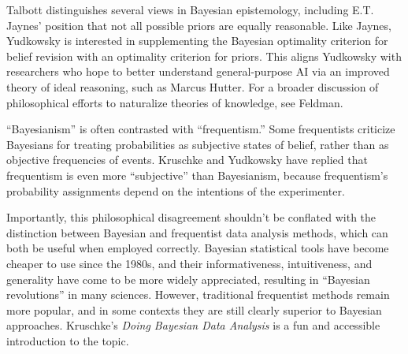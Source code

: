 {
 Talbott distinguishes several views in Bayesian epistemology,
including E.T. Jaynes' position that not all possible
priors are equally reasonable. Like Jaynes,
Yudkowsky is interested in supplementing the Bayesian optimality
criterion for belief revision with an optimality criterion for priors.
This aligns Yudkowsky with researchers who hope to better understand
general-purpose AI via an improved theory of ideal reasoning, such as
Marcus Hutter. For a broader discussion of
philosophical efforts to naturalize theories of knowledge, see
Feldman.}

{
 ``Bayesianism'' is often
contrasted with ``frequentism.''
Some frequentists criticize Bayesians for treating probabilities as
subjective states of belief, rather than as objective frequencies of
events. Kruschke and Yudkowsky have replied that frequentism is even
more ``subjective'' than
Bayesianism, because frequentism's probability
assignments depend on the intentions of the
experimenter.}

{
 Importantly, this philosophical disagreement
shouldn't be conflated with the distinction between
Bayesian and frequentist data analysis methods, which can both be
useful when employed correctly. Bayesian statistical tools have become
cheaper to use since the 1980s, and their informativeness,
intuitiveness, and generality have come to be more widely appreciated,
resulting in ``Bayesian
revolutions'' in many sciences. However, traditional
frequentist methods remain more popular, and in some contexts they are
still clearly superior to Bayesian approaches.
Kruschke's \textit{Doing Bayesian Data Analysis} is a
fun and accessible introduction to the topic.}

